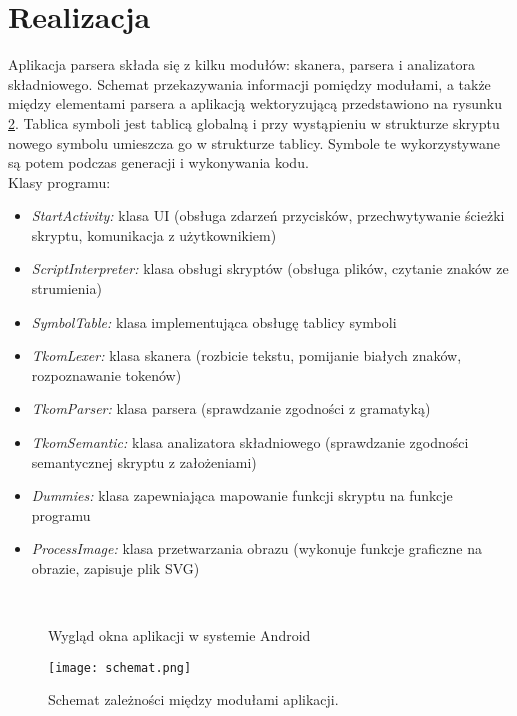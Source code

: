 \documentclass[11pt,a4paper]{article}
\begin{document}
\section{Realizacja}
Aplikacja parsera składa się z kilku modułów: skanera, parsera i analizatora składniowego. Schemat przekazywania informacji pomiędzy modułami, a także między elementami parsera a aplikacją wektoryzującą przedstawiono na rysunku \ref{schemat}. Tablica symboli jest tablicą globalną i przy wystąpieniu w strukturze skryptu nowego symbolu umieszcza go w strukturze tablicy. Symbole te wykorzystywane są potem podczas generacji i wykonywania kodu.
\\Klasy programu:
\begin{itemize}
\item \emph{StartActivity:} 	klasa UI (obsługa zdarzeń przycisków, przechwytywanie ścieżki skryptu, komunikacja z użytkownikiem)
\item \emph{ScriptInterpreter:} klasa obsługi skryptów (obsługa plików, czytanie znaków ze strumienia)
\item \emph{SymbolTable:} klasa implementująca obsługę tablicy symboli
\item \emph{TkomLexer:} klasa skanera (rozbicie tekstu, pomijanie białych znaków, rozpoznawanie tokenów)
\item \emph{TkomParser:} klasa parsera (sprawdzanie zgodności z gramatyką)
\item \emph{TkomSemantic:} klasa analizatora składniowego (sprawdzanie zgodności semantycznej skryptu z założeniami)
\item \emph{Dummies:} klasa zapewniająca mapowanie funkcji skryptu na funkcje programu
\item \emph{ProcessImage:} klasa przetwarzania obrazu (wykonuje funkcje graficzne na obrazie, zapisuje plik SVG)
\end{itemize}
\begin{figure}
\centering
\mbox{
\quad
{}
}
\caption{Wygląd okna aplikacji w systemie Android}\label{android} 
\end{figure}
\begin{figure}
\texttt{[image: schemat.png]}
\caption{Schemat zależności między modułami aplikacji.}
\label{schemat}
\end{figure}
\end{document}
